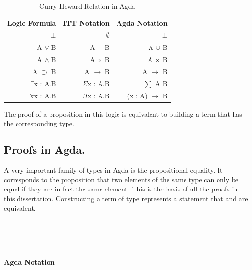 \documentclass[12pt,twoside,notitlepage]{report}
\begin{document}
\begin{table}[h!]
\centering
	\begin{tabular}{r r r} 
	\hline 
	Logic Formula & ITT Notation & Agda Notation \\
	\hline
	$⊥$  & $∅$  & $⊥$ \\
	A $∨$ B & A + B &   A $⊎$ B \\
	A $∧$ B & A $×$ B &   A $×$ B \\
	A $⊃$ B & A $→$ B &   A $→$ B \\ 
	$∃$x : A.B & $Σ$x : A.B & $\sum$ A B \\
	$∀$x : A.B & $Π$x : A.B & (x : A) $→$  B\\ 
	\hline
	\end{tabular}
\caption{Curry Howard Relation in Agda}
\label{tab:curry}
\end{table} 

The proof of a proposition in this logic is equivalent to building a term that has the corresponding type.

\subsection{Proofs in Agda.}

A very important family of types in Agda is the propositional equality. It corresponds to the proposition that two elements of the same type can only be equal if they are in fact the same element. 
This is the basis of all the proofs in this dissertation. Constructing a term of type    represents a statement that  and  are equivalent.

\begin{code}
\\
\>  \AgdaSymbol{\{}\AgdaSymbol{\}} \AgdaSymbol{\{} \AgdaSymbol{:}  \AgdaSymbol{\}} \AgdaSymbol{(} \AgdaSymbol{:} \AgdaSymbol{)} \AgdaSymbol{:}     \<%
\\
\>[0]\<[2]%
\>[2] \AgdaSymbol{:}   \<%
\\
\end{code}

\paragraph{Agda Notation}
\end{document}
